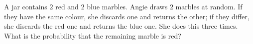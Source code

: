 A jar contains $2$ red and $2$ blue marbles. Angie draws $2$ marbles at random. If they have the same colour, she discards one and returns the other; if they differ, she discards the red one and returns the blue one. She does this three times. What is the probability that the remaining marble is red?
